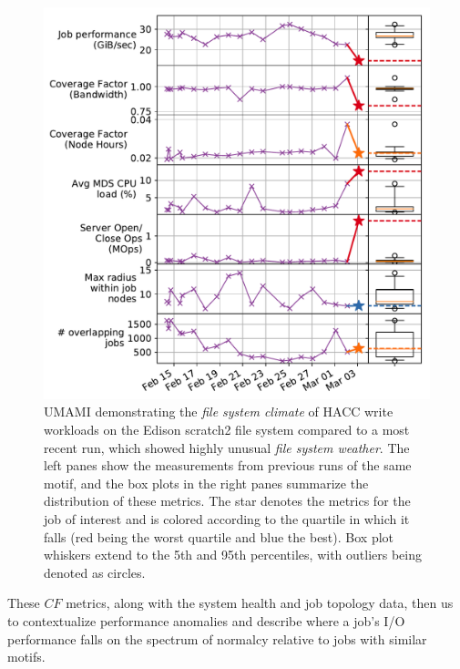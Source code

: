 \begin{figure}[t]
    \centering
    \includegraphics[width=1.0\columnwidth]{figs/umami-scratch2-hacc-write.pdf}
    \caption{UMAMI demonstrating the \emph{file system climate} of HACC write workloads on the Edison scratch2 file system compared to a most recent run, which showed highly unusual \emph{file system weather}.
    The left panes show the measurements from previous runs of the same motif, and the box plots in the right panes summarize the distribution of these metrics.
    The star denotes the metrics for the job of interest and is colored according to the quartile in which it falls (red being the worst quartile and blue the best).
    Box plot whiskers extend to the 5th and 95th percentiles, with outliers being denoted as circles.}
    \label{fig:umami-scratch2-hacc-write}
\vspace{-.2in}
\end{figure}

These $\mathit{CF}$ metrics, along with the system health and job topology data, then us to contextualize performance anomalies and describe where a job's I/O performance falls on the spectrum of normalcy relative to jobs with similar motifs.


